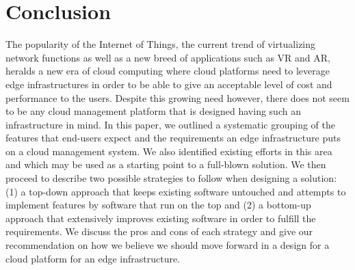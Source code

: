 
\section{Conclusion}
\label{sec:conclusion}

The popularity of the Internet of Things, the current trend of virtualizing network functions as well as a new breed of applications such as VR and AR, heralds a new era of cloud computing where cloud platforms need to leverage edge infrastructures in order to be able to give an acceptable level of cost and performance to the users.  Despite this growing need however, there does not seem to be any cloud management platform that is designed having such an infrastructure in mind. In this paper, we outlined a systematic grouping of the features that end-users expect and the requirements an edge infrastructure puts on a cloud management system. We also identified existing efforts in this area and which may be used as a starting point to a full-blown solution. We then proceed to describe two possible strategies to follow when designing a solution: (1) a top-down approach that keeps existing software untouched and attempts to implement features by software that run on the top and (2) a bottom-up approach that extensively improves existing software in order to fulfill the requirements. We discuss the pros and cons of each strategy and  give our recommendation on how we believe we should move forward in a design for a cloud platform for an edge infrastructure.